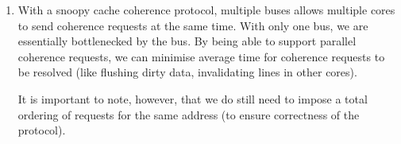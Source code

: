 \begin{enumerate}[label=(\alph*)]
  \item

    With a snoopy cache coherence protocol, multiple buses allows multiple cores to send coherence requests at the same time. With only one bus, we are essentially bottlenecked by the bus. By being able to support parallel coherence requests, we can minimise average time for coherence requests to be resolved (like flushing dirty data, invalidating lines in other cores).

    It is important to note, however, that we do still need to impose a total ordering of requests for the same address (to ensure correctness of the protocol).



        
\end{enumerate}

